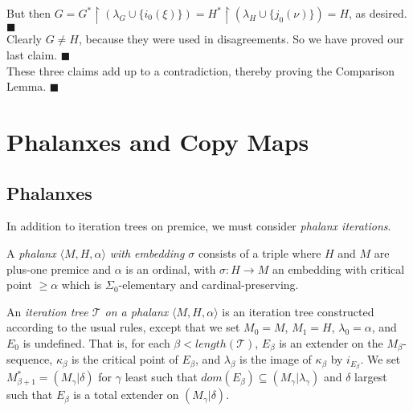 \documentclass[12pt]{article}
\begin{document}
But then $G = G^* \restriction ( \lambda_G \cup \{ i_0 (\xi) \} ) = H^* \restriction (\lambda_H \cup \{ j_0 (\nu) \} ) = H$, as desired. $\blacksquare$\\

Clearly $G \neq H$, because they were used in disagreements.  So we have proved our last claim. $\blacksquare$\\

These three claims add up to a contradiction, thereby proving the Comparison Lemma. $\blacksquare$\\



\section{Phalanxes and Copy Maps}


\subsection{Phalanxes}

In addition to iteration trees on premice, we must consider \textit{phalanx iterations}.\\

\begin{def} \label{phalanx}
A \textit{phalanx} $\langle M, H, \alpha \rangle$ \textit{with embedding $\sigma$} consists of a triple where $H$ and $M$ are plus-one premice and $\alpha$ is an ordinal, with $\sigma : H \longrightarrow M$ an embedding with critical point $\geq \alpha$ which is $\Sigma_0$-elementary and cardinal-preserving.
\end{def}

\begin{def} \label{iteration tree on phalanx}
An \textit{iteration tree $\mathscr{T}$ on a phalanx} $\langle M, H, \alpha \rangle$ is an iteration tree constructed according to the usual rules, except that we set $M_0 = M$, $M_1 = H$, $\lambda_0 = \alpha$, and $E_0$ is undefined.  That is, for each $\beta < length( \mathscr{T} )$, $E_\beta$ is an extender on the $M_\beta$-sequence, $\kappa_\beta$ is the critical point of $E_\beta$, and $\lambda_\beta$ is the image of $\kappa_\beta$ by $i_{E_\beta}$.  We set $M_{\beta + 1}^* = (M_{\gamma} | \delta )$ for $\gamma$ least such that $dom(E_\beta ) \subseteq (M_\gamma | \lambda_\gamma)$ and $\delta$ largest such that $E_\beta$ is a total extender on $(M_{\gamma} | \delta )$.
\end{def}
\end{document}
